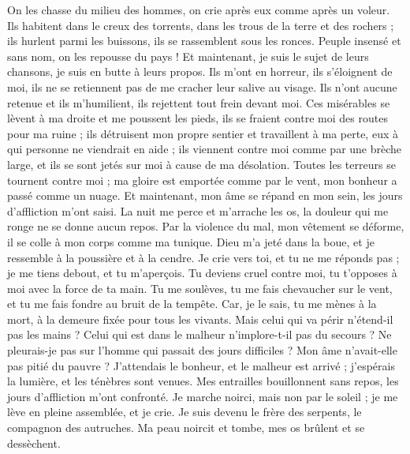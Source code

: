 \begin{multicols}{2}
On les chasse du milieu des hommes, on crie après eux comme après un voleur.
Ils habitent dans le creux des torrents, dans les trous de la terre et des rochers ;
ils hurlent parmi les buissons, ils se rassemblent sous les ronces.
Peuple insensé et sans nom, on les repousse du pays !
Et maintenant, je suis le sujet de leurs chansons, je suis en butte à leurs propos.
Ils m'ont en horreur, ils s'éloignent de moi, ils ne se retiennent pas de me cracher leur salive au visage.
Ils n'ont aucune retenue et ils m'humilient, ils rejettent tout frein devant moi.
Ces misérables se lèvent à ma droite et me poussent les pieds, ils se fraient contre moi des routes pour ma ruine ;
ils détruisent mon propre sentier et travaillent à ma perte, eux à qui personne ne viendrait en aide ;
ils viennent contre moi comme par une brèche large, et ils se sont jetés sur moi à cause de ma désolation.
Toutes les terreurs se tournent contre moi ; ma gloire est emportée comme par le vent, mon bonheur a passé comme un nuage.
Et maintenant, mon âme se répand en mon sein, les jours d'affliction m'ont saisi.
La nuit me perce et m'arrache les os, la douleur qui me ronge ne se donne aucun repos.
Par la violence du mal, mon vêtement se déforme, il se colle à mon corps comme ma tunique.
Dieu m'a jeté dans la boue, et je ressemble à la poussière et à la cendre.
Je crie vers toi, et tu ne me réponds pas ; je me tiens debout, et tu m'aperçois.
Tu deviens cruel contre moi, tu t'opposes à moi avec la force de ta main.
Tu me soulèves, tu me fais chevaucher sur le vent, et tu me fais fondre au bruit de la tempête.
Car, je le sais, tu me mènes à la mort, à la demeure fixée pour tous les vivants.
Mais celui qui va périr n'étend-il pas les mains ? Celui qui est dans le malheur n'implore-t-il pas du secours ?
Ne pleurais-je pas sur l'homme qui passait des jours difficiles ? Mon âme n'avait-elle pas pitié du pauvre ?
J'attendais le bonheur, et le malheur est arrivé ; j'espérais la lumière, et les ténèbres sont venues.
Mes entrailles bouillonnent sans repos, les jours d'affliction m'ont confronté.
Je marche noirci, mais non par le soleil ; je me lève en pleine assemblée, et je crie.
Je suis devenu le frère des serpents, le compagnon des autruches.
Ma peau noircit et tombe, mes os brûlent et se dessèchent.

\end{multicols}
